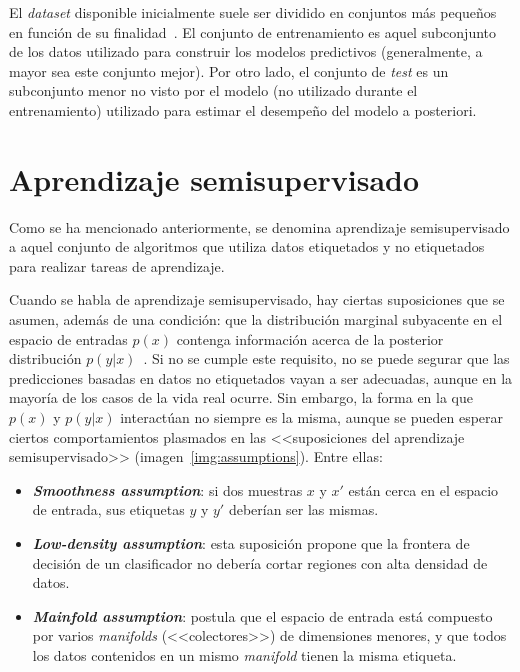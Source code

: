 El \textit{dataset} disponible inicialmente suele ser dividido en conjuntos más pequeños en función de su finalidad~\cite{apuntesSisint}. El conjunto de entrenamiento es aquel subconjunto de los datos utilizado para construir los modelos predictivos (generalmente, a mayor sea este conjunto mejor). Por otro lado, el conjunto de \textit{test} es un subconjunto menor no visto por el modelo (no utilizado durante el entrenamiento) utilizado para estimar el desempeño del modelo a posteriori.


\section{Aprendizaje semisupervisado}

Como se ha mencionado anteriormente, se denomina aprendizaje semisupervisado a aquel conjunto de algoritmos que utiliza datos etiquetados y no etiquetados para realizar tareas de aprendizaje. 

Cuando se habla de aprendizaje semisupervisado, hay ciertas suposiciones que se asumen, además de una condición: que la distribución marginal subyacente en el espacio de entradas $p(x)$ contenga información acerca de la posterior distribución $p(y|x)$~\cite{engelen2020surveyOnSemiSupervised}. Si no se cumple este requisito, no se puede segurar que las predicciones basadas en datos no etiquetados vayan a ser adecuadas, aunque en la mayoría de los casos de la vida real ocurre. Sin embargo, la forma en la que $p(x)$ y $p(y|x)$ interactúan no siempre es la misma, aunque se pueden esperar ciertos comportamientos plasmados en las <<suposiciones del aprendizaje semisupervisado>> (imagen~\ref{img:assumptions}). Entre ellas:

\begin{itemize}
	\item \textbf{\textit{Smoothness assumption}}: si dos muestras $x$ y $x'$ están cerca en el espacio de entrada, sus etiquetas $y$ y $y'$ deberían ser las mismas.
	
	\item \textbf{\textit{Low-density assumption}}: esta suposición propone que la frontera de decisión de un clasificador no debería cortar regiones con alta densidad de datos.
	
	\item \textbf{\textit{Mainfold assumption}}: postula que el espacio de entrada está compuesto por varios \textit{manifolds} (<<colectores>>) de dimensiones menores, y que todos los datos contenidos en un mismo \textit{manifold} tienen la misma etiqueta.
\end{itemize}


